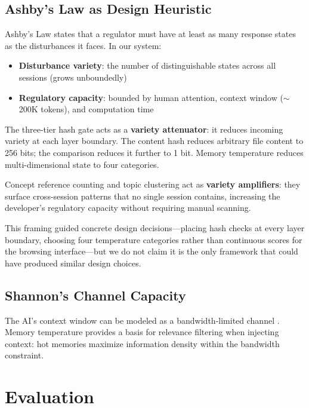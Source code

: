 \documentclass[11pt]{article}
\begin{document}
\subsection{Ashby's Law as Design Heuristic}

Ashby's Law \citep{ashby1956} states that a regulator must have at least as many response states as the disturbances it faces. In our system:

\begin{itemize}[nosep]
  \item \textbf{Disturbance variety}: the number of distinguishable states across all sessions (grows unboundedly)
  \item \textbf{Regulatory capacity}: bounded by human attention, context window ($\sim$200K tokens), and computation time
\end{itemize}

The three-tier hash gate acts as a \textbf{variety attenuator}: it reduces incoming variety at each layer boundary. The content hash reduces arbitrary file content to 256 bits; the comparison reduces it further to 1 bit. Memory temperature reduces multi-dimensional state to four categories.

Concept reference counting and topic clustering act as \textbf{variety amplifiers}: they surface cross-session patterns that no single session contains, increasing the developer's regulatory capacity without requiring manual scanning.

This framing guided concrete design decisions---placing hash checks at every layer boundary, choosing four temperature categories rather than continuous scores for the browsing interface---but we do not claim it is the only framework that could have produced similar design choices.

\subsection{Shannon's Channel Capacity}

The AI's context window can be modeled as a bandwidth-limited channel \citep{shannon1948}. Memory temperature provides a basis for relevance filtering when injecting context: hot memories maximize information density within the bandwidth constraint.

\section{Evaluation}
\label{sec:evaluation}
\end{document}
